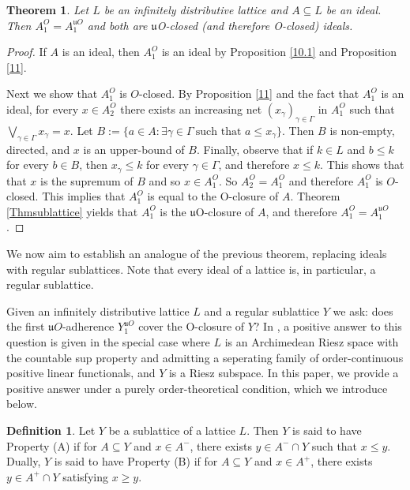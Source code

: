 \documentclass[12pt,a4paper]{amsart}
\numberwithin{equation}{section}
\newtheorem{thm}{Theorem}
\theoremstyle{definition}
\newtheorem{defn}{Definition}
\begin{document}
\begin{thm}\label{22}
	Let $ L$ be an infinitely distributive lattice and $ A \subseteq  L$ be an ideal. Then $ A_{1}^{O}= A_{1}^{\mathfrak{u}O}$ and both are  $\mathfrak{u}$O-closed (and therefore O-closed) ideals.
\end{thm}
\begin{proof}
	
If $ A$ is an ideal, then $ A_{1}^{O}$ is an ideal by Proposition \ref{10.1} and Proposition \ref{11}.
 
Next we show that $ A_{1}^{O}$ is $O$-closed. By Proposition \ref{11}  and the fact that $ A_{1}^{O}$ is an ideal, for every $x \in  A_{2}^{O}$ there exists an increasing net $(x_{\gamma})_{\gamma \in \Gamma}$ in $ A_{1}^{O}$ such that $\bigvee_{\gamma \in \Gamma} x_{\gamma} = x$. Let $B:=\{a \in  A : \exists \gamma\in\Gamma\ \mbox{such that }a \leq x_{\gamma} \}$.  Then $B$ is non-empty, directed, and $x$ is an upper-bound of $B$. Finally, observe that if $k\in L$ and $b \leq k$ for every $b \in B$, then  $x_{\gamma} \leq k$ for every $\gamma \in \Gamma$, and therefore $x \leq k$.  This shows that  that $x$ is the supremum of $B$ and so  $x\in  A_{1}^{O}$. So $ A_2^O= A_1^O$ and therefore $ A_{1}^{O}$ is $O$-closed. This implies that  $ A_1^O$ is equal to the O-closure of $ A$.  Theorem \ref{Thmsublattice} yields that $ A_1^O$ is the $\mathfrak{u}$O-closure of $ A$, and therefore $ A_1^O= A_{1}^{\mathfrak{u}O}$.   
	\end{proof}

We now aim to establish an analogue of the previous theorem, replacing ideals with regular sublattices. Note that every ideal of a lattice is, in particular, a regular sublattice.

Given an infinitely distributive lattice $L$ and a regular sublattice $Y$ we ask: does the first $\mathfrak{u}O$-adherence $Y_{1}^{\mathfrak{u}O}$ cover the O-closure of $Y$?
In \cite[Theorem 2]{GAOLEU17}, a positive answer to this question is given in the special case where 
$L$ is an Archimedean Riesz space with the countable sup property and admitting a seperating family of order-continuous positive linear functionals, and $Y$ is a   Riesz subspace.
In this paper, we provide a positive answer under a purely order-theoretical condition, which we introduce below.

\begin{defn}
		Let $Y$ be a sublattice of a lattice $L$. Then $Y$ is said to have Property (A) if for $A \subseteq Y$ and $x \in A^{-}$, there exists $y \in A^{-}\cap {Y}$ such that $x \leq y$. Dually, $Y$ is said to have Property (B) if for $A \subseteq Y$ and $x \in A^{+}$, there exists $y \in A^{+}\cap{Y}$ satisfying $x \geq y$.
	\end{defn}
\end{document}

